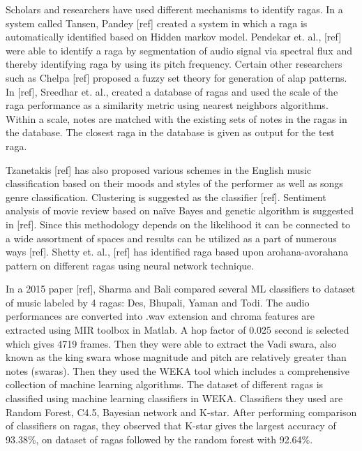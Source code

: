 \doublespacing
\setlength{\parindent}{1cm}

Scholars and researchers have used different mechanisms to identify ragas. In a system called Tansen, Pandey [ref] created a system in which a raga is automatically identified based on Hidden markov model. Pendekar et. al., [ref] were able to identify a raga by segmentation of audio signal via spectral flux and thereby identifying raga by using its pitch frequency. Certain other researchers such as Chelpa [ref] proposed a fuzzy set theory for generation of alap patterns.  In [ref], Sreedhar et. al., created a database of ragas and used the scale of the raga performance as a similarity metric using nearest neighbors algorithms. Within a scale, notes are matched with the existing sets of notes in the ragas in the database. The closest raga in the database is given as output for the test raga.
\par
Tzanetakis [ref] has also proposed various schemes in the English music classification based on their moods and styles of the performer as well as songs genre classification. Clustering is suggested as the classifier [ref]. Sentiment analysis of movie review based on naïve Bayes and genetic algorithm is suggested in [ref]. Since this methodology depends on the likelihood it can be connected to a wide assortment of spaces and results can be utilized as a part of numerous ways [ref]. Shetty et. al., [ref] has identified raga based upon arohana-avorahana pattern on different ragas using neural network technique.
\par
In a 2015 paper [ref], Sharma and Bali compared several ML classifiers to dataset of music labeled by 4 ragas: Des, Bhupali, Yaman and Todi. The audio performances are converted into .wav extension and chroma features are extracted using MIR toolbox in Matlab. A hop factor of 0.025 second is selected which gives 4719 frames. Then they were able to extract the Vadi swara, also known as the king swara whose magnitude and pitch are relatively greater than notes (swaras). Then they used the WEKA tool which includes a comprehensive collection of machine learning algorithms. The dataset of different ragas is classified using machine learning classifiers in WEKA. Classifiers they used are Random Forest, C4.5, Bayesian network and K-star. After performing comparison of classifiers on ragas, they observed that K-star gives the largest accuracy of 93.38\%, on dataset of ragas followed by the random forest with 92.64\%.  
